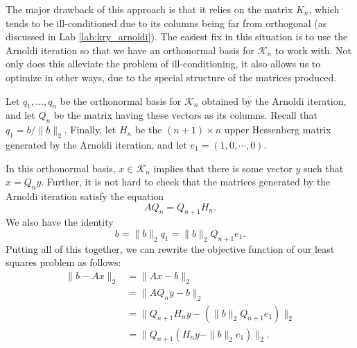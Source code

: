 The major drawback of this approach is that it relies on the matrix $K_n$, which tends to be ill-conditioned due to its columns
being far from orthogonal (as discussed in Lab \ref{lab:kry_arnoldi}).
The easiest fix in this situation is to use the Arnoldi iteration so that we have an orthonormal basis for $\mathcal{K}_n$ to work with.
Not only does this alleviate the problem of ill-conditioning, it also allows us to optimize in other ways, due to the special
structure of the matrices produced.

Let $q_1,\ldots, q_n$ be the orthonormal basis for $\mathcal{K}_n$ obtained by the Arnoldi iteration, and let $Q_n$ be the matrix
having these vectors as its columns.
Recall that $q_1 = b/\|b\|_2$.
Finally, let $H_n$ be the $(n+1)\times n$ upper Hessenberg matrix generated by the Arnoldi iteration, and let $e_1=(1,0,\cdots,0)$.

In this orthonormal basis, $x \in \mathcal{K}_n$ implies that there is some vector $y$ such that $x = Q_n y$.
Further, it is not hard to check that the matrices generated by the Arnoldi iteration satisfy the equation
\[
AQ_n = Q_{n+1}H_n.
\]
We also have the identity
\[
b = \|b\|_2q_1 = \|b\|_2Q_{n+1}e_1.
\]
Putting all of this together, we can rewrite the objective function of our least squares problem as follows:
\begin{align*}
\|b - Ax\|_2 &= \|Ax - b\|_2\\
&= \|AQ_ny - b\|_2\\
&= \|Q_{n+1}H_ny - \left(\|b\|_2Q_{n+1}e_1\right)\|_2\\
&= \|Q_{n+1}\left(H_n y - \|b\|_2e_1\right)\|_2.
\end{align*}

